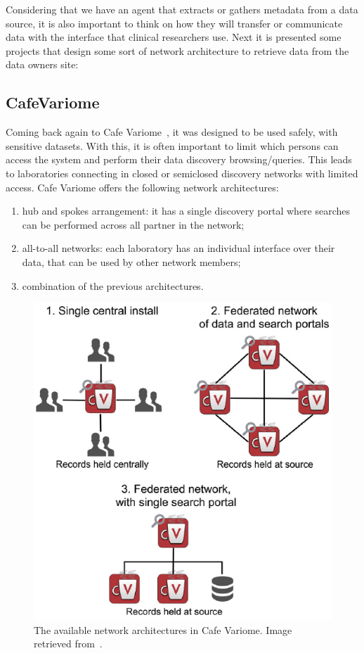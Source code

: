 Considering that we have an agent that extracts or gathers metadata from a data source,
it is also important to think on how they will transfer or communicate data with the
interface that clinical researchers use.
Next it is presented some projects that design some sort of network architecture to
retrieve data from the data owners site:


\subsection*{CafeVariome}
Coming back again to Cafe Variome~\cite{cafevariome}, it was designed to be used safely, with sensitive datasets.
With this, it is often important to limit which persons can access the system and perform their data discovery browsing/queries.
This leads to laboratories connecting in closed or semiclosed discovery networks with limited access.
Cafe Variome offers the following network architectures:
\begin{enumerate}
    \item hub and spokes arrangement: it has a single discovery portal where searches can be performed across all partner in the network;
    \item all-to-all networks: each laboratory has an individual interface over their data, that can be used by other network members;
    \item combination of the previous architectures.
\end{enumerate}

\begin{figure}[H]
    \centering
    \includegraphics[width=.5\linewidth]{cafevariome-network.png}
    \caption{The available network architectures in Cafe Variome. Image retrieved from~\cite{cafevariome}.}
\end{figure}

